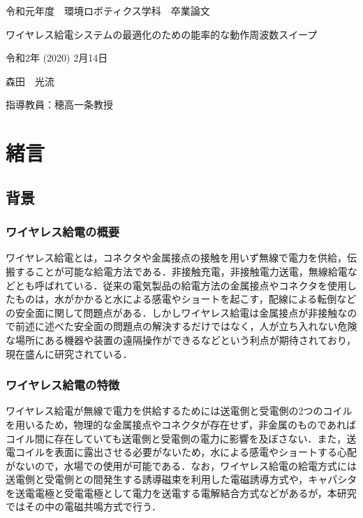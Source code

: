 \documentclass[12pt]{jarticle}
\begin{document}
	
\thispagestyle{empty}

\vspace*{20mm}
\begin{center}
	{\Large 令和元年度　環境ロボティクス学科　卒業論文}
\end{center}
\vspace{10mm}
\begin{center}
	{\Huge ワイヤレス給電システムの最適化のための能率的な動作周波数スイープ}
\end{center}
\vspace{90mm}
\begin{center}
	{\Large 令和2年 (2020) 2月14日}
\end{center}
\begin{center}
	{\Large 森田　光流}
\end{center}
\begin{center}
	{\Large 指導教員：穂高一条教授}
\end{center}

\clearpage

\tableofcontents

\clearpage

\section{緒言}
\subsection{背景}
\subsubsection{ワイヤレス給電の概要}
ワイヤレス給電とは，コネクタや金属接点の接触を用いず無線で電力を供給，伝搬することが可能な給電方法である．非接触充電，非接触電力送電，無線給電などとも呼ばれている．従来の電気製品の給電方法の金属接点やコネクタを使用したものは，水がかかると水による感電やショートを起こす，配線による転倒などの安全面に関して問題点がある．しかしワイヤレス給電は金属接点が非接触なので前述に述べた安全面の問題点の解決するだけではなく，人が立ち入れない危険な場所にある機器や装置の遠隔操作ができるなどという利点が期待されており，現在盛んに研究されている．
\subsubsection{ワイヤレス給電の特徴}
ワイヤレス給電が無線で電力を供給するためには送電側と受電側の2つのコイルを用いるため，物理的な金属接点やコネクタが存在せず，非金属のものであればコイル間に存在していても送電側と受電側の電力に影響を及ぼさない．また，送電コイルを表面に露出させる必要がないため，水による感電やショートする心配がないので，水場での使用が可能である．なお，ワイヤレス給電の給電方式には送電側と受電側との間発生する誘導磁束を利用した電磁誘導方式や，キャパシタを送電電極と受電電極として電力を送電する電解結合方式などがある\cite{rohm2}\cite{ito}が，本研究ではその中の電磁共鳴方式で行う．
\end{document}
